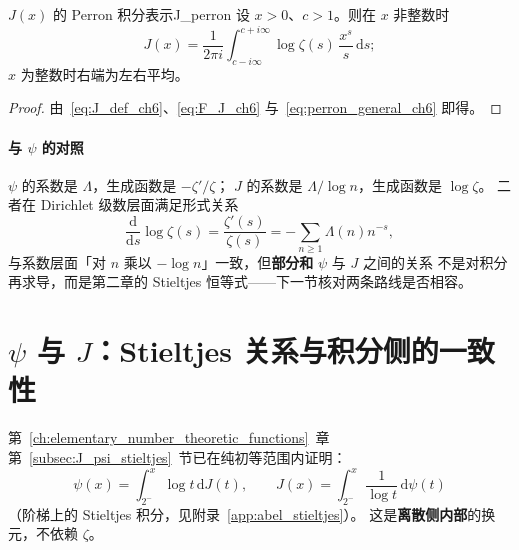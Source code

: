 \begin{theorem}{$J(x)$ 的 Perron 积分表示}{J_perron}
设 $x>0$、$c>1$。则在 $x$ 非整数时
\begin{equation}
  J(x)
  =\frac{1}{2\pi i}
  \int_{c-i\infty}^{c+i\infty}
  \log\zeta(s)\,\frac{x^s}{s}\,\mathrm{d}s;
  \label{eq:J_perron}
\end{equation}
$x$ 为整数时右端为左右平均。
\end{theorem}

\begin{proof}
由~\eqref{eq:J_def_ch6}、\eqref{eq:F_J_ch6} 与~\eqref{eq:perron_general_ch6} 即得。
\end{proof}

\paragraph{与 $\psi$ 的对照}
$\psi$ 的系数是 $\Lambda$，生成函数是 $-\zeta'/\zeta$；
$J$ 的系数是 $\Lambda/\log n$，生成函数是 $\log\zeta$。
二者在 Dirichlet 级数层面满足形式关系
\[
  \frac{\mathrm{d}}{\mathrm{d}s}\log\zeta(s)
  =\frac{\zeta'(s)}{\zeta(s)}
  =-\sum_{n\ge 1}\Lambda(n)n^{-s},
\]
与系数层面「对 $n$ 乘以 $-\log n$」一致，但\textbf{部分和} $\psi$ 与 $J$ 之间的关系
不是对积分再求导，而是第二章的 Stieltjes 恒等式——下一节核对两条路线是否相容。


\section{\texorpdfstring{$\psi$}{psi} 与 \texorpdfstring{$J$}{J}：Stieltjes 关系与积分侧的一致性}
\label{sec:psi_J_consistency}

第~\ref{ch:elementary_number_theoretic_functions}~章第~\ref{subsec:J_psi_stieltjes}~节已在纯初等范围内证明：
\begin{equation}
  \psi(x)=\int_{2^-}^{x}\log t\,\mathrm{d}J(t),
  \qquad
  J(x)=\int_{2^-}^{x}\frac{1}{\log t}\,\mathrm{d}\psi(t)
  \label{eq:psi_J_stieltjes_ch6}
\end{equation}
（阶梯上的 Stieltjes 积分，见附录~\ref{app:abel_stieltjes}）。
这是\textbf{离散侧内部}的换元，不依赖 $\zeta$。

